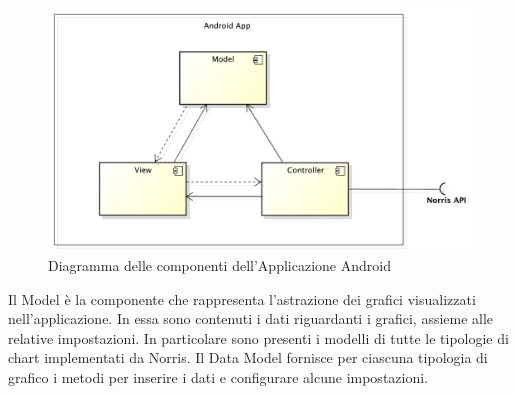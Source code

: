 	\begin{figure}[H]\centering
        \includegraphics[width=\textwidth]{SpecificaTecnica/Pics/ComponentiApplicazione}
        \caption{Diagramma delle componenti dell'Applicazione Android}
    \end{figure}
        Il Model è la componente che rappresenta l'astrazione dei grafici visualizzati nell'applicazione. In essa sono contenuti i dati riguardanti i grafici, assieme alle relative impostazioni. In particolare sono presenti i modelli di tutte le tipologie di chart implementati da Norris. Il Data Model fornisce per ciascuna tipologia di grafico i metodi per inserire i dati e configurare alcune impostazioni. 
    
